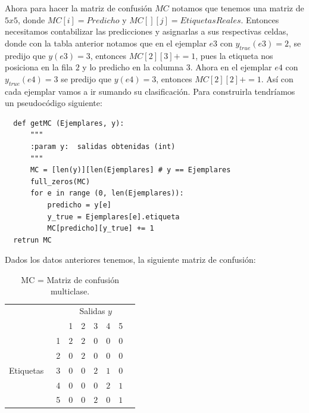 \begin{description}
\begin{example}
\begin{center}
\begin{tabular}{c|ccccccccccccccc}
\end{tabular}
\end{center}
\end{example}

 Ahora para hacer la matriz de confusión $MC$ notamos que tenemos una matriz de $5 x 5$, donde $MC[i]= Predicho$ y $MC[][j] = EtiquetasReales$. Entonces necesitamos contabilizar las predicciones y asignarlas a sus respectivas celdas, donde con la tabla anterior notamos que en el ejemplar $e3$ con $y_{true}(e3)= 2$, se predijo que $y(e3)=3$, entonces $MC[2][3] +=1$, pues la etiqueta nos posiciona en la fila $2$ y lo predicho en la columna $3$. Ahora en el ejemplar $e4$ con $y_{true}(e4)= 3$ se predijo que $y(e4)= 3$, entonces  $MC[2][2] +=1$. Así con cada ejemplar vamos a ir sumando su clasificación. Para construirla tendríamos un pseudocódigo siguiente:
 \begin{verbatim}
  def getMC (Ejemplares, y):
      """
      :param y:  salidas obtenidas (int)
      """
      MC = [len(y)][len(Ejemplares] # y == Ejemplares
      full_zeros(MC)
      for e in range (0, len(Ejemplares)):
          predicho = y[e]
          y_true = Ejemplares[e].etiqueta
          MC[predicho][y_true] += 1
  retrun MC
 \end{verbatim}

Dados los datos anteriores tenemos, la siguiente matriz de confusión: 
 \begin{table}[H]
\begin{center}
\begin{tabular}{|c|c|c|c|c|c|c|c|}
\cline{3-8}
\multicolumn{2}{c|}{} & \multicolumn{5}{c|}{Salidas $y$} \\
\cline{3-8}
\multicolumn{2}{c|}{} & 1 & 2 & 3 & 4 & 5 \\
\hline
\multirow{5}{*}{\begin{sideways} Etiquetas~ \end{sideways}} & 1 & $2$ & $2$ & $0$ & $0$ & $0$ \\
\cline{2-8}
& 2 & $0$ & $2$  & $0$ & $0$ & $0$ \\
\cline{2-8}
& 3 & $0$ & $0$  & $2$ & $1$ & $0$ \\
\cline{2-8}
& 4 & $0$ & $0$  & $0$ & $2$ & $1$ \\
\cline{2-8}
& 5 & $0$ & $0$  & $2$ & $0$ & $1$ \\
\hline
\end{tabular}
\end{center}
\caption{MC = Matriz de confusión multiclase.}
\label{Table2}
\end{table}


\end{description}
